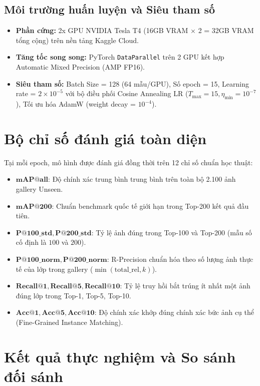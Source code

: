\documentclass[12pt,a4paper]{report}
\begin{document}
\subsection{Môi trường huấn luyện và Siêu tham số}
\begin{itemize}[leftmargin=*]
    \item \textbf{Phần cứng:} 2x GPU NVIDIA Tesla T4 (16GB VRAM $\times$ 2 = 32GB VRAM tổng cộng) trên nền tảng Kaggle Cloud.
    \item \textbf{Tăng tốc song song:} PyTorch \texttt{DataParallel} trên 2 GPU kết hợp Automatic Mixed Precision (AMP FP16).
    \item \textbf{Siêu tham số:} Batch Size = 128 (64 mẫu/GPU), Số epoch = 15, Learning rate = $2 \times 10^{-5}$ với bộ điều phối Cosine Annealing LR ($T_{\max}=15, \eta_{\min}=10^{-7}$), Tối ưu hóa AdamW (weight decay = $10^{-4}$).
\end{itemize}

\section{Bộ chỉ số đánh giá toàn diện}
Tại mỗi epoch, mô hình được đánh giá đồng thời trên 12 chỉ số chuẩn học thuật:
\begin{itemize}[leftmargin=*]
    \item $\mathbf{mAP@all}$: Độ chính xác trung bình trung bình trên toàn bộ 2.100 ảnh gallery Unseen.
    \item $\mathbf{mAP@200}$: Chuẩn benchmark quốc tế giới hạn trong Top-200 kết quả đầu tiên.
    \item $\mathbf{P@100\_std, P@200\_std}$: Tỷ lệ ảnh đúng trong Top-100 và Top-200 (mẫu số cố định là $100$ và $200$).
    \item $\mathbf{P@100\_norm, P@200\_norm}$: R-Precision chuẩn hóa theo số lượng ảnh thực tế của lớp trong gallery ($\min(\text{total\_rel}, k)$).
    \item $\mathbf{Recall@1, Recall@5, Recall@10}$: Tỷ lệ truy hồi bắt trúng ít nhất một ảnh đúng lớp trong Top-1, Top-5, Top-10.
    \item $\mathbf{Acc@1, Acc@5, Acc@10}$: Độ chính xác khớp đúng chính xác bức ảnh cụ thể (Fine-Grained Instance Matching).
\end{itemize}

\section{Kết quả thực nghiệm và So sánh đối sánh}
\end{document}
